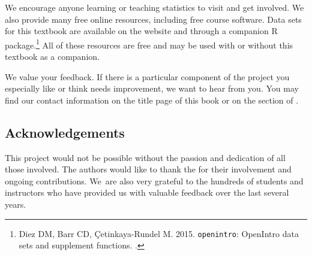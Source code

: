 We encourage anyone learning or teaching statistics to visit  and get involved. We also provide many free online resources, including free course software. Data sets for this textbook are available on the website and through a companion R package.\footnote{Diez DM, Barr CD, \c{C}etinkaya-Rundel M. 2015. \texttt{openintro}: OpenIntro data sets and supplement functions. .} All of these resources are free and may be used with or without this textbook as a companion.

We value your feedback. If there is a particular component of the project you especially like or think needs improvement, we want to hear from you. You may find our contact information on the title page of this book or on the  section of .

\subsection*{Acknowledgements}

This project would not be possible without the passion and dedication of all those involved. %
The authors would like to thank the  for their involvement and ongoing contributions. We~are also very grateful to the hundreds of students and instructors who have provided us with valuable feedback over the last several years.
